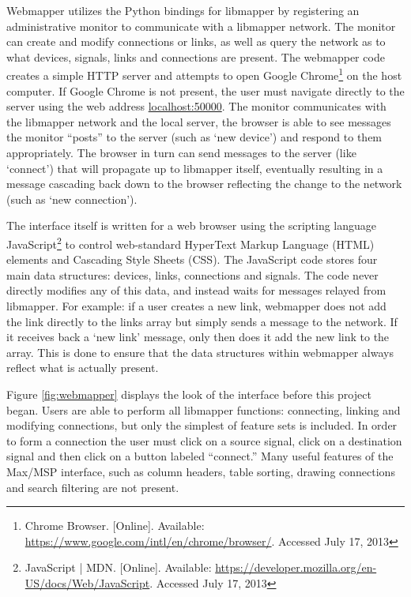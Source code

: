 Webmapper utilizes the Python bindings for libmapper by registering an administrative monitor to communicate with a libmapper network. The monitor can create and modify connections or links, as well as query the network as to what devices, signals, links and connections are present. The webmapper code creates a simple HTTP server and attempts to open Google Chrome\footnote{Chrome Browser. [Online]. Available: \url{https://www.google.com/intl/en/chrome/browser/}. Accessed July 17, 2013} on the host computer. If Google Chrome is not present, the user must navigate directly to the server using the web address \url{localhost:50000}. The monitor communicates with the libmapper network and the local server, the browser is able to see messages the monitor ``posts'' to the server (such as `new device') and respond to them appropriately. The browser in turn can send messages to the server (like `connect') that will propagate up to libmapper itself, eventually resulting in a message cascading back down to the browser reflecting the change to the network (such as `new connection'). 

The interface itself is written for a web browser using the scripting language JavaScript\footnote{JavaScript | MDN. [Online]. Available: \url{https://developer.mozilla.org/en-US/docs/Web/JavaScript}. Accessed July 17, 2013} to control web-standard HyperText Markup Language (HTML) elements and Cascading Style Sheets (CSS). The JavaScript code stores four main data structures: devices, links, connections and signals. The code never directly modifies any of this data, and instead waits for messages relayed from libmapper. For example: if a user creates a new link, webmapper does not add the link directly to the links array but simply sends a message to the network. If it receives back a `new link' message, only then does it add the new link to the array. This is done to ensure that the data structures within webmapper always reflect what is actually present.

Figure \ref{fig:webmapper} displays the look of the interface before this project began. Users are able to perform all libmapper functions: connecting, linking and modifying connections, but only the simplest of feature sets is included. In order to form a connection the user must click on a source signal, click on a destination signal and then click on a button labeled ``connect.'' Many useful features of the Max/MSP interface, such as column headers, table sorting, drawing connections and search filtering are not present.

